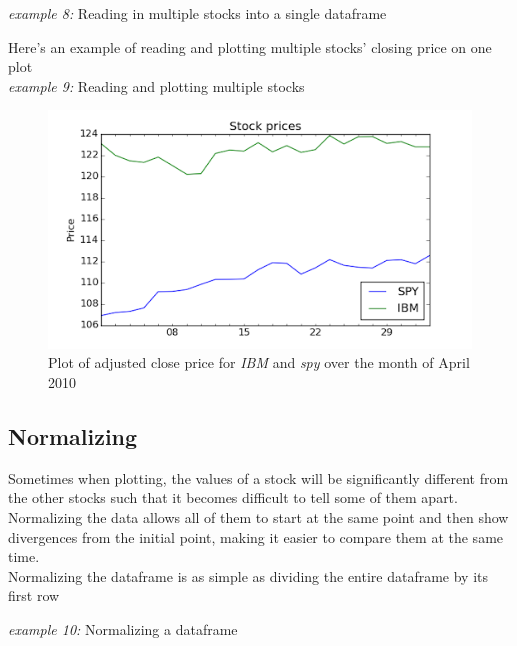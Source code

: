 \noindent\begin{minipage}{\linewidth}
\noindent\textit{example 8:} Reading in multiple stocks into a single dataframe


\end{minipage}

\noindent\begin{minipage}{\linewidth}
\noindent Here's an example of reading and plotting multiple stocks' closing price on one plot\\
\noindent\textit{example 9:} Reading and plotting multiple stocks


\end{minipage}

\begin{figure}
	\centering
	\includegraphics[width=\textwidth]{images/adj_close_mar.png}
    \caption{Plot of adjusted close price for \textit{IBM} and \textit{spy} over the month of April 2010}
\end{figure}

\subsection{Normalizing}
\noindent Sometimes when plotting, the values of a stock will be significantly different from the other stocks such that it becomes difficult to tell some of them apart. Normalizing the data allows all of them to start at the same point and then show divergences from the initial point, making it easier to compare them at the same time.\\

\noindent Normalizing the dataframe is as simple as dividing the entire dataframe by its first row
\noindent\begin{minipage}{\linewidth}
\noindent\textit{example 10:} Normalizing a dataframe


\end{minipage}


